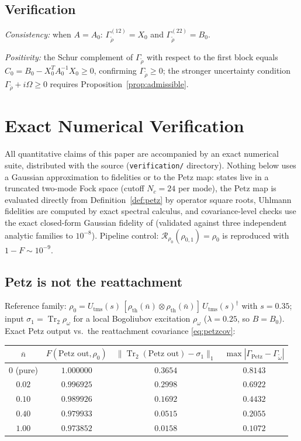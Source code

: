 \documentclass[11pt,a4paper]{article}
\theoremstyle{plain}
\theoremstyle{definition}
\theoremstyle{remark}
\newcommand{\Tr}{\operatorname{Tr}}
\begin{document}
\subsection{Verification}

\emph{Consistency:} when $A = A_0$: $\Gamma_{\tilde{\rho}}^{(12)} = X_0$ and
$\Gamma_{\tilde{\rho}}^{(22)} = B_0$. \checkmark

\emph{Positivity:} the Schur complement of $\Gamma_{\tilde{\rho}}$ with respect
to the first block equals $C_0 = B_0 - X_0^T A_0^{-1} X_0 \ge 0$, confirming
$\Gamma_{\tilde{\rho}} \ge 0$; the stronger uncertainty condition
$\Gamma_{\tilde{\rho}} + i\Omega \ge 0$ requires
Proposition~\ref{prop:admissible}. \checkmark

\section{Exact Numerical Verification}\label{app:numerics}

All quantitative claims of this paper are accompanied by an exact numerical
suite, distributed with the source (\texttt{verification/} directory). Nothing
below uses a Gaussian approximation to fidelities or to the Petz map: states live
in a truncated two-mode Fock space (cutoff $N_c = 24$ per mode), the Petz map is
evaluated directly from Definition~\ref{def:petz} by operator square roots,
Uhlmann fidelities are computed by exact spectral calculus, and covariance-level
checks use the exact closed-form Gaussian fidelity of \cite{BanchiBP15}
(validated against three independent analytic families to $10^{-8}$). Pipeline
control: $\mathcal{R}_{\rho_0}(\rho_{0,1}) = \rho_0$ is reproduced with
$1 - F \sim 10^{-9}$.

\subsection{Petz is not the reattachment}

Reference family: $\rho_0 = U_{\mathrm{tms}}(s)\,
[\rho_{\mathrm{th}}(\bar{n}) \otimes \rho_{\mathrm{th}}(\bar{n})]\,
U_{\mathrm{tms}}(s)^\dagger$ with $s = 0.35$; input $\sigma_1 = \Tr_2\rho_\omega$
for a local Bogoliubov excitation $\rho_\omega$ ($\lambda = 0.25$, so $B = B_0$).
Exact Petz output vs.\ the reattachment covariance \eqref{eq:petzcov}:

\begin{center}
\begin{tabular}{c|c|c|c}
$\bar{n}$ & $F(\text{Petz out}, \rho_0)$ &
$\|\Tr_2(\text{Petz out}) - \sigma_1\|_1$ &
$\max|\Gamma_{\mathrm{Petz}} - \Gamma_{\tilde{\omega}}|$ \\
\hline
$0$ (pure) & $1.000000$ & $0.3654$ & $0.8143$ \\
$0.02$ & $0.996925$ & $0.2998$ & $0.6922$ \\
$0.10$ & $0.989926$ & $0.1692$ & $0.4432$ \\
$0.40$ & $0.979933$ & $0.0515$ & $0.2055$ \\
$1.00$ & $0.973852$ & $0.0158$ & $0.1072$
\end{tabular}
\end{center}
\end{document}
